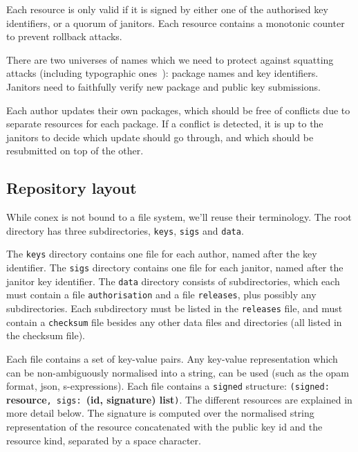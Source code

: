 \documentclass[nocopyrightspace]{sigplanconf}
\begin{document}
Each resource is only valid if it is signed by either one of the authorised key identifiers, or a quorum of janitors.
Each resource contains a monotonic counter to prevent rollback attacks.

There are two universes of names which we need to protect against squatting attacks (including typographic ones~\cite{typo}): package names and key identifiers.
Janitors need to faithfully verify new package and public key submissions.

Each author updates their own packages, which should be free of conflicts due to separate resources for each package.
If a conflict is detected, it is up to the janitors to decide which update should go through, and which should be resubmitted on top of the other.

\subsection{Repository layout}
While conex is not bound to a file system, we'll reuse their terminology.
The root directory has three subdirectories, \texttt{keys}, \texttt{sigs} and \texttt{data}.

The \texttt{keys} directory contains one file for each author, named after the key identifier.
The \texttt{sigs} directory contains one file for each janitor, named after the janitor key identifier.
The \texttt{data} directory consists of subdirectories, which each must contain a file \texttt{authorisation} and a file \texttt{releases}, plus possibly any subdirectories.
Each subdirectory must be listed in the \texttt{releases} file, and must contain a \texttt{checksum} file besides any other data files and directories (all listed in the checksum file).

Each file contains a set of key-value pairs.
Any key-value representation which can be non-ambiguously normalised into a string, can be used (such as the opam format, json, s-expressions).
Each file contains a \texttt{signed} structure: \texttt{(signed: }\textbf{resource}\texttt{, sigs: }\textbf{(id, signature) list}\texttt{)}.
The different resources are explained in more detail below.
The signature is computed over the normalised string representation of the resource concatenated with the public key id and the resource kind, separated by a space character.
\end{document}
